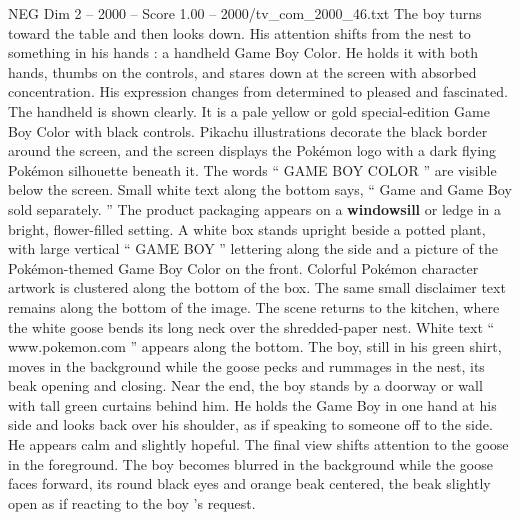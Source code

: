 \begin{textsample}{NEG Dim 2 – 2000 – Score 1.00 – 2000/tv\_com\_2000\_46.txt}
The boy turns toward the table and then looks down.
His attention shifts from the nest to something in his hands : a handheld Game Boy Color.
He holds it with both hands, thumbs on the controls, and stares down at the screen with absorbed concentration.
His expression changes from determined to pleased and fascinated.
The handheld is shown clearly.
It is a pale yellow or gold special-edition Game Boy Color with black controls.
Pikachu illustrations decorate the black border around the screen, and the screen displays the Pokémon logo with a dark flying Pokémon silhouette beneath it.
The words “ GAME BOY COLOR ” are visible below the screen.
Small white text along the bottom says, “ Game and Game Boy sold separately. ” The product packaging appears on a \textbf{windowsill} or ledge in a bright, flower-filled setting.
A white box stands upright beside a potted plant, with large vertical “ GAME BOY ” lettering along the side and a picture of the Pokémon-themed Game Boy Color on the front.
Colorful Pokémon character artwork is clustered along the bottom of the box.
The same small disclaimer text remains along the bottom of the image.
The scene returns to the kitchen, where the white goose bends its long neck over the shredded-paper nest.
White text “ www.pokemon.com ” appears along the bottom.
The boy, still in his green shirt, moves in the background while the goose pecks and rummages in the nest, its beak opening and closing.
Near the end, the boy stands by a doorway or wall with tall green curtains behind him.
He holds the Game Boy in one hand at his side and looks back over his shoulder, as if speaking to someone off to the side.
He appears calm and slightly hopeful.
The final view shifts attention to the goose in the foreground.
The boy becomes blurred in the background while the goose faces forward, its round black eyes and orange beak centered, the beak slightly open as if reacting to the boy ’s request.

\end{textsample}

